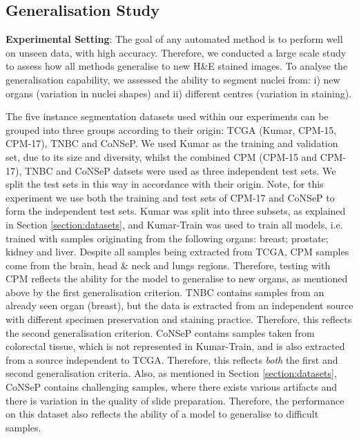\documentclass[journal]{IEEEtran}
\begin{document}
	\subsection{Generalisation Study} \label{section:generalise}
	
	\textbf{Experimental Setting}: The goal of any automated method is to perform well on unseen data, with high accuracy. Therefore, we conducted a large scale study to assess how all methods generalise to new H\&E stained images. To analyse the generalisation capability, we assessed the ability to segment nuclei from: i) new organs (variation in nuclei shapes) and ii) different centres (variation in staining). 
	 
	The five instance segmentation datasets used within our experiments can be grouped into three groups according to their origin: TCGA (Kumar, CPM-15, CPM-17), TNBC and CoNSeP. We used Kumar as the training and validation set, due to its size and diversity, whilst the combined CPM (CPM-15 and CPM-17), TNBC and CoNSeP datsets were used as three independent test sets. We split the test sets in this way in accordance with their origin. Note, for this experiment we use both the training and test sets of CPM-17 and CoNSeP to form the independent test sets. Kumar was split into three subsets, as explained in Section \ref{section:datasets}, and Kumar-Train was used to train all models, i.e. trained with samples originating from the following organs: breast; prostate; kidney and liver. Despite all samples being extracted from TCGA, CPM samples come from the brain, head \& neck and lungs regions. Therefore, testing with CPM reflects the ability for the model to generalise to new organs, as mentioned above by the first generalisation criterion. TNBC contains samples from an already seen organ (breast), but the data is extracted from an independent source with different specimen preservation and staining practice. Therefore, this reflects the second generalisation criterion. CoNSeP contains samples taken from colorectal tissue, which is not represented in Kumar-Train, and is also extracted from a source independent to TCGA. Therefore, this reflects \textit{both} the first and second generalisation criteria. Also, as mentioned in Section \ref{section:datasets}, CoNSeP contains challenging samples, where there exists various artifacts and there is variation in the quality of slide preparation. Therefore, the performance on this dataset also reflects the ability of a model to generalise to difficult samples. 
	
		
	
\end{document}
